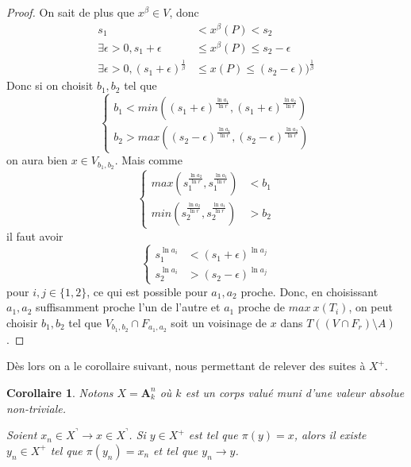 \documentclass[11pt]{article}
\newcommand{\ana}{\mathbf{A}}
\newtheorem{cor}[thm]{Corollaire}
\begin{document}
\begin{proof}
On sait de plus que $x^\beta \in V$, donc 
\begin{align*}
s_1 &< x^\beta(P) <s_2 \\
\exists \epsilon > 0 , s_1 + \epsilon &\leq x^\beta(P) \leq s_2 -\epsilon\\
 \exists \epsilon > 0 , (s_1 + \epsilon)^{\frac{1}{\beta}} &\leq x(P) \leq (s_2 -\epsilon))^{\frac{1}{\beta}}
\end{align*}
Donc si on choisit $b_1, b_2$ tel que 
\begin{equation*}
\left\{
	\begin{array}{ll}
		b_1 < min ((s_1 + \epsilon)^{\frac{\ln a_1}{\ln r}}, (s_1 + \epsilon)^{\frac{\ln a_2}{\ln r}}) \\
		b_2 > max ((s_2 - \epsilon)^{\frac{\ln a_1}{\ln r}}, (s_2 - \epsilon)^{\frac{\ln a_2}{\ln r}})
	\end{array}
\right.
\end{equation*}
on aura bien $x\in V_{b_1, b_2}$. Mais comme
\begin{equation*}
\left\{
    \begin{array}{ll}
        max (s_1^\frac{\ln a_2}{\ln r}, s_1^\frac{\ln a_1}{\ln r}) &< b_1 \\
        min (s_2^\frac{\ln a_2}{\ln r}, s_2^\frac{\ln a_1}{\ln r}) &> b_2 
    \end{array}
\right.
\end{equation*}
il faut avoir 
\begin{equation*}
\left\{
    \begin{array}{ll}
        s_1^{\ln a_i} &< (s_1 +\epsilon)^{\ln a_j} \\
        s_2^{\ln a_i} &> (s_2 -\epsilon)^{\ln a_j} 
    \end{array}
\right.
\end{equation*}
pour $i, j \in \lbrace 1, 2 \rbrace$, ce qui est possible pour $a_1, a_2$ proche. Donc, en choisissant $a_1, a_2$ suffisamment proche l'un de l'autre et $a_1$ proche de $max~x(T_i)$, on peut choisir $b_1, b_2$ tel que $V_{b_1, b_2} \cap F_{a_1, a_2}$ soit un voisinage de $x$ dans $T((V \cap F_r)\setminus A)$.
\end{proof}

Dès lors on a le corollaire suivant, nous permettant de relever des suites à $X^+$.

\begin{cor}\label{existence de releve pour les suites convergentes}
Notons $X = \ana^n_k$ où $k$ est un corps valué muni d'une valeur absolue non-triviale.

Soient $x_n \in X^\urcorner \rightarrow x \in X^\urcorner$. Si $y \in X^+$ est tel que $\pi(y) = x$, alors il existe $y_n \in X^+$ tel que $\pi(y_n) = x_n$ et tel que $y_n \rightarrow y$. 
\end{cor}
\end{document}
